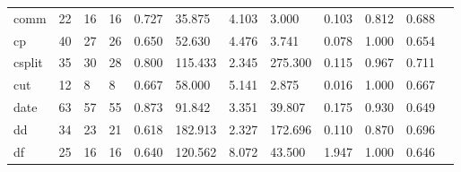 \begin{longtable}{lp{1.00cm}p{1.00cm}p{1.00cm}p{1.00cm}p{1.00cm}p{1.00cm}p{1.00cm}p{1.00cm}p{1.00cm}p{1.00cm}p{1.00cm}}
comm      &                           22 &                 16 &                                16 &                                      0.727 &                                 35.875 &                                        4.103 &                             3.000 &                                   0.103 &                        0.812 &                                        0.688 \\
cp        &                           40 &                 27 &                                26 &                                      0.650 &                                 52.630 &                                        4.476 &                             3.741 &                                   0.078 &                        1.000 &                                        0.654 \\
csplit    &                           35 &                 30 &                                28 &                                      0.800 &                                115.433 &                                        2.345 &                           275.300 &                                   0.115 &                        0.967 &                                        0.711 \\
cut       &                           12 &                  8 &                                 8 &                                      0.667 &                                 58.000 &                                        5.141 &                             2.875 &                                   0.016 &                        1.000 &                                        0.667 \\
date      &                           63 &                 57 &                                55 &                                      0.873 &                                 91.842 &                                        3.351 &                            39.807 &                                   0.175 &                        0.930 &                                        0.649 \\
dd        &                           34 &                 23 &                                21 &                                      0.618 &                                182.913 &                                        2.327 &                           172.696 &                                   0.110 &                        0.870 &                                        0.696 \\
df        &                           25 &                 16 &                                16 &                                      0.640 &                                120.562 &                                        8.072 &                            43.500 &                                   1.947 &                        1.000 &                                        0.646 \\

\end{longtable}
